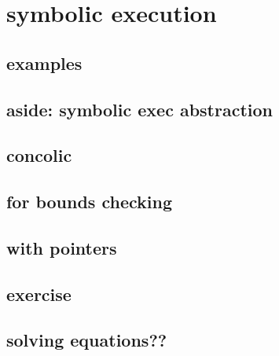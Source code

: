 \section{symbolic execution}



\subsection{examples}




\subsection{aside: symbolic exec abstraction}


\subsection{concolic}


\subsection{for bounds checking}


\subsection{with pointers}


\subsection{exercise}


\subsection{solving equations??}

